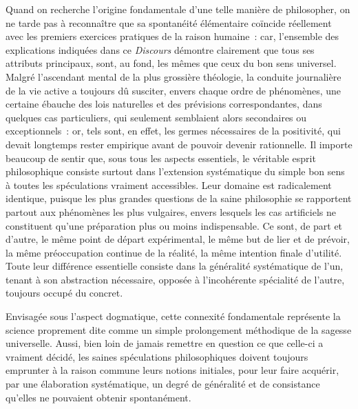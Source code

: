 \documentclass[french,twoside]{book} %
\begin{document}
Quand on recherche l’origine fondamentale d’une telle manière de philosopher, on ne tarde pas à reconnaître que sa spontanéité élémentaire coïncide réellement avec les premiers exercices pratiques de la raison humaine : car, l’ensemble des explications indiquées dans ce {\itshape Discours} démontre clairement que tous ses attributs principaux, sont, au fond, les mêmes que ceux du bon sens universel. Malgré l’ascendant mental de la plus grossière théologie, la conduite journalière de la vie active a toujours dû susciter, envers chaque ordre de phénomènes, une certaine ébauche des lois naturelles et des prévisions correspondantes, dans quelques cas particuliers, qui seulement semblaient alors secondaires ou exceptionnels : or, tels sont, en effet, les germes nécessaires de la positivité, qui devait longtemps rester empirique avant de pouvoir devenir rationnelle. Il importe beaucoup de sentir que, sous tous les aspects essentiels, le véritable esprit philosophique consiste surtout dans l’extension systématique du simple bon sens à toutes les spéculations vraiment accessibles. Leur domaine est radicalement identique, puisque les plus grandes questions de la saine philosophie se rapportent partout aux phénomènes les plus vulgaires, envers lesquels les cas artificiels ne constituent qu’une préparation plus ou moins indispensable. Ce sont, de part et d’autre, le même point de départ expérimental, le même but de lier et de prévoir, la même préoccupation continue de la réalité, la même intention finale d’utilité. Toute leur différence essentielle consiste dans la généralité systématique de l’un, tenant à son abstraction nécessaire, opposée à l’incohérente spécialité de l’autre, toujours occupé du concret.\par
Envisagée sous l’aspect dogmatique, cette connexité fondamentale représente la science proprement dite comme un simple prolongement méthodique de la sagesse universelle. Aussi, bien loin de jamais remettre en question ce que celle-ci a vraiment décidé, les saines spéculations philosophiques doivent toujours emprunter à la raison commune leurs notions initiales, pour leur faire acquérir, par une élaboration systématique, un degré de généralité et de consistance qu’elles ne pouvaient obtenir spontanément.\par
\end{document}
